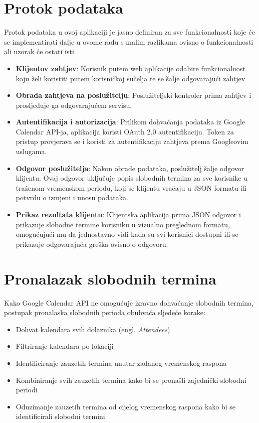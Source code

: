 \documentclass{foi}
\begin{document}
\section{Protok podataka}

Protok podataka u ovoj aplikaciji je jasno definiran za sve funkcionalnosti koje će se implementirati dalje u ovome radu s malim razlikama ovisno o funkcionalnosti ali uzorak će ostati isti.
\begin{itemize}
    \item \textbf{Klijentov zahtjev}: Korisnik putem web aplikacije odabire funkcionalnost koju želi koristiti putem korisničkoj sučelja te se šalje odgovarajući zahtjev
    \item \textbf{Obrada zahtjeva na poslužitelju}: Poslužiteljski kontroler prima zahtjev i prosljeđuje ga odgovarajućem servisu.
    \item \textbf{Autentifikacija i autorizacija}: Prilikom dohvaćanja podataka iz Google Calendar API-ja, aplikacija koristi OAuth 2.0 autentifikaciju. Token za pristup provjerava se i koristi za autentifikaciju zahtjeva prema Googleovim uslugama.
    \item \textbf{Odgovor poslužitelja}: Nakon obrade podataka, poslužitelj šalje odgovor klijentu. Ovaj odgovor uključuje popis slobodnih termina za sve korisnike u traženom vremenskom periodu, koji se klijentu vraćaju u JSON formatu ili potvrdu o izmjeni i unosu podataka.
    \item \textbf{Prikaz rezultata klijentu}: Klijentska aplikacija prima JSON odgovor i prikazuje slobodne termine korisniku u vizualno preglednom formatu, omogućujući mu da jednostavno vidi kada su svi korisnici dostupni ili se prikazuje odgovarajuća greška ovisno o odgovoru.
\end{itemize}

\section{Pronalazak slobodnih termina}
Kako Google Calendar API ne omogućuje izravno dohvaćanje slobodnih termina, postupak pronalaska slobodnih perioda obuhvaća sljedeće korake:
\begin{itemize}
    \item Dohvat kalendara svih dolaznika (engl. \textit{Attendees})
    \item Filtriranje kalendara po lokaciji
    \item Identificiranje zauzetih termina unutar zadanog vremenskog raspona
    \item Kombiniranje svih zauzetih termina kako bi se pronašli zajednički slobodni periodi
    \item Oduzimanje zauzetih termina od cijelog vremenskog raspona kako bi se identificirali slobodni termini
\end{itemize}
\end{document}
